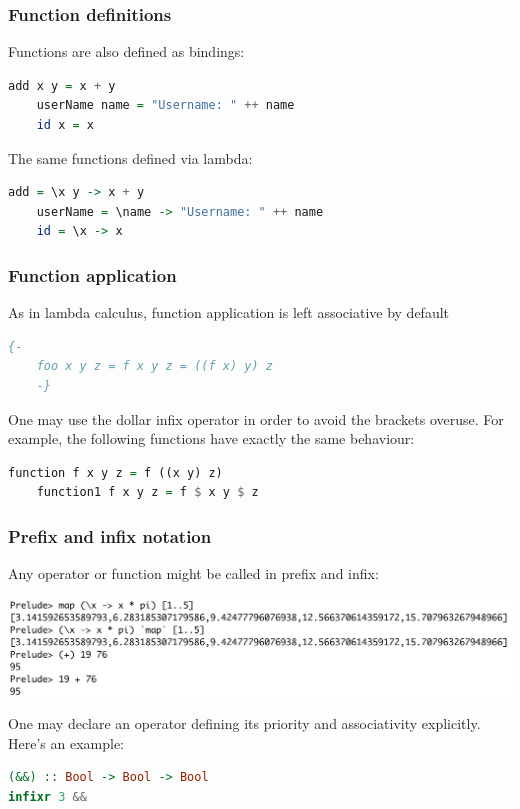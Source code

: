 \documentclass[10pt,pdf,utf8,russian,aspectratio=169]{beamer}
\begin{document}
\begin{frame}[fragile]
  \frametitle{Function definitions}

  Functions are also defined as bindings:

  \begin{lstlisting}[language=Haskell]
    add x y = x + y
    userName name = "Username: " ++ name
    id x = x
  \end{lstlisting}

  \vspace{\baselineskip}

  The same functions defined via lambda:
  \begin{lstlisting}[language=Haskell]
    add = \x y -> x + y
    userName = \name -> "Username: " ++ name
    id = \x -> x
  \end{lstlisting}
\end{frame}

\begin{frame}[fragile]
  \frametitle{Function application}

  As in lambda calculus, function application is left associative by default

  \begin{lstlisting}[language=Haskell]
    {-
    foo x y z = f x y z = ((f x) y) z
    -}
  \end{lstlisting}

\vspace{\baselineskip}

  One may use the dollar infix operator in order to avoid the brackets overuse. For example, the following functions have exactly the same behaviour:

  \begin{lstlisting}[language=Haskell]
    function f x y z = f ((x y) z)
    function1 f x y z = f $ x y $ z
  \end{lstlisting}
\end{frame}

\begin{frame}[fragile]
  \frametitle{Prefix and infix notation}
  Any operator or function might be called in prefix and infix:

  \begin{center}
  \includegraphics[scale=0.41]{Pics/InfixPrefix.png}
  \end{center}

  \vspace{\baselineskip}

  One may declare an operator defining its priority and associativity explicitly. Here's an example:

\begin{lstlisting}[language=Haskell]
(&&) :: Bool -> Bool -> Bool
infixr 3 &&
\end{lstlisting}
\end{frame}
\end{document}
